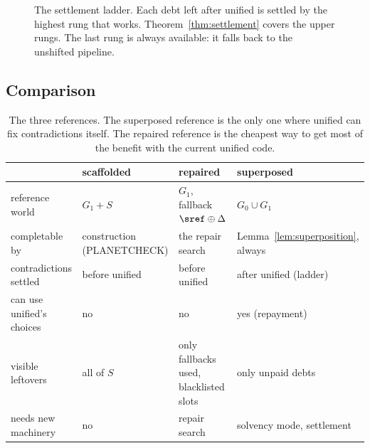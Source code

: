 \begin{figure}[t]
\centering
{}
\caption{The settlement ladder. Each debt left after unified is settled by the highest rung that works. Theorem~\ref{thm:settlement} covers the upper rungs. The last rung is always available: it falls back to the unshifted pipeline.}
\label{fig:ladder}
\end{figure}

\subsection{Comparison}

\begin{table}[H]
\centering\small
\begin{tabularx}{\linewidth}{@{}l X X X@{}}
\toprule
 & scaffolded & repaired & superposed \\
\midrule
reference world & $G_1+S$ & $G_1$, fallback $\sref\oplus\Delta$ & $G_0\cup G_1$ \\
completable by & construction (PLANETCHECK) & the repair search & Lemma~\ref{lem:superposition}, always \\
contradictions settled & before unified & before unified & after unified (ladder) \\
can use unified's choices & no & no & yes (repayment) \\
visible leftovers & all of $S$ & only fallbacks used, blacklisted slots & only unpaid debts \\
needs new machinery & no & repair search & solvency mode, settlement \\
\bottomrule
\end{tabularx}
\caption{The three references. The superposed reference is the only one where unified can fix contradictions itself. The repaired reference is the cheapest way to get most of the benefit with the current unified code.}
\label{tab:compare}
\end{table}

